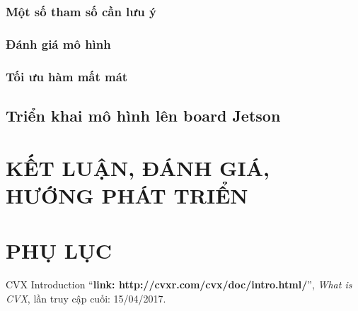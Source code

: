 \documentclass[a4paper]{report}
\begin{document}
\subsection{Một số tham số cần lưu ý}
\subsection{Đánh giá mô hình}
\subsection{Tối ưu hàm mất mát}

\section{Triển khai mô hình lên board Jetson}

\chapter{KẾT LUẬN, ĐÁNH GIÁ, HƯỚNG PHÁT TRIỂN}

\chapter*{PHỤ LỤC}
\begin{thebibliography}{80}

CVX Introduction
``\textbf{link: http://cvxr.com/cvx/doc/intro.html/}'',
\textit{What is CVX}, lần truy cập cuối: 15/04/2017.

\end{thebibliography}
\end{document}
